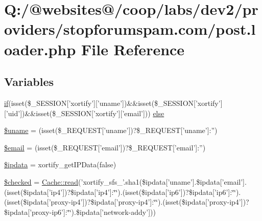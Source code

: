 \hypertarget{stopforumspam_8com_2post_8loader_8php}{\section{Q\-:/@websites@/coop/labs/dev2/providers/stopforumspam.com/post.loader.\-php File Reference}
\label{stopforumspam_8com_2post_8loader_8php}
}
\subsection*{Variables}
\begin{DoxyCompactItemize}
\item 
\hyperlink{index_8php_ae2ccdf355624402b65fc2226f2a661cd}{if}(isset(\$\-\_\-\-S\-E\-S\-S\-I\-O\-N\mbox{[}'xortify'\mbox{]}\mbox{[}'uname'\mbox{]})\&\&isset(\$\-\_\-\-S\-E\-S\-S\-I\-O\-N\mbox{[}'xortify'\mbox{]}\mbox{[}'uid'\mbox{]})\&\&isset(\$\-\_\-\-S\-E\-S\-S\-I\-O\-N\mbox{[}'xortify'\mbox{]}\mbox{[}'email'\mbox{]})) \hyperlink{stopforumspam_8com_2post_8loader_8php_a99f38b0c8c178a9286d03586510aa646}{else}
\item 
\hyperlink{stopforumspam_8com_2post_8loader_8php_a227a9443cabbe5e23cfc10c4371e09d1}{\$uname} = (isset(\$\-\_\-\-R\-E\-Q\-U\-E\-S\-T\mbox{[}'uname'\mbox{]})?\$\-\_\-\-R\-E\-Q\-U\-E\-S\-T\mbox{[}'uname'\mbox{]}\-:'')
\item 
\hyperlink{stopforumspam_8com_2post_8loader_8php_ad634f418b20382e2802f80532d76d3cd}{\$email} = (isset(\$\-\_\-\-R\-E\-Q\-U\-E\-S\-T\mbox{[}'email'\mbox{]})?\$\-\_\-\-R\-E\-Q\-U\-E\-S\-T\mbox{[}'email'\mbox{]}\-:'')
\item 
\hyperlink{stopforumspam_8com_2post_8loader_8php_a2538b33e5d86382acfcd6fc288dedbb0}{\$ipdata} = xortify\-\_\-get\-I\-P\-Data(false)
\item 
\hyperlink{stopforumspam_8com_2post_8loader_8php_aae831eeaf71994cc7e31c1412a29f6fd}{\$checked} = \hyperlink{class_cache_a5870656fdf4e51f8bb35330a8f96ed6c}{Cache\-::read}('xortify\-\_\-sfs\-\_\-'.sha1(\$ipdata\mbox{[}'uname'\mbox{]}.\$ipdata\mbox{[}'email'\mbox{]}.(isset(\$ipdata\mbox{[}'ip4'\mbox{]})?\$ipdata\mbox{[}'ip4'\mbox{]}\-:\char`\"{}\char`\"{}).(isset(\$ipdata\mbox{[}'ip6'\mbox{]})?\$ipdata\mbox{[}'ip6'\mbox{]}\-:\char`\"{}\char`\"{}).(isset(\$ipdata\mbox{[}'proxy-\/ip4'\mbox{]})?\$ipdata\mbox{[}'proxy-\/ip4'\mbox{]}\-:\char`\"{}\char`\"{}).(isset(\$ipdata\mbox{[}'proxy-\/ip4'\mbox{]})?\$ipdata\mbox{[}'proxy-\/ip6'\mbox{]}\-:\char`\"{}\char`\"{}).\$ipdata\mbox{[}'network-\/addy'\mbox{]}))
\end{DoxyCompactItemize}


